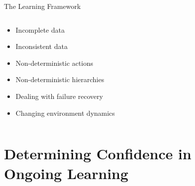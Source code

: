 \documentclass[10pt]{beamer}
\begin{document}
\begin{frame}{The Learning Framework}
\begin{columns}
\begin{column}[l]{0.6\textwidth}
\begin{overlayarea}{\columnwidth}{5cm}
{\begin{columns}
\begin{column}[l]{0.85\textwidth}
\begin{itemize}
\item<9-> Incomplete data
\item<10-> Inconsistent data
\item<11-> Non-deterministic actions
\item<12-> Non-deterministic hierarchies
\item<13-> Dealing with failure recovery
\item<14-> Changing environment dynamics
\end{itemize}
\end{column}
\end{columns}
}
\end{overlayarea}
\end{column}
\end{columns}

\begin{overlayarea}{\columnwidth}{1cm} 
\end{overlayarea}


\end{frame}

\section{Determining Confidence in Ongoing Learning}
\end{document}
